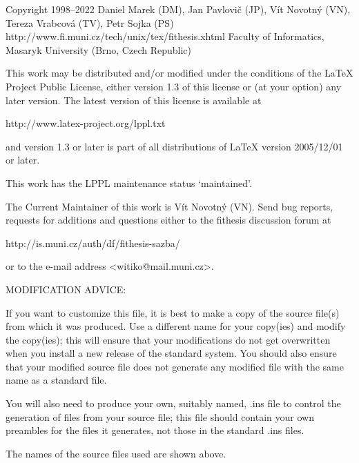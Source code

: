 
\preamble

Copyright 1998--2022  Daniel Marek (DM), Jan Pavlovič (JP),
                      Vít Novotný (VN), Tereza Vrabcová (TV),
                      Petr Sojka (PS)
http://www.fi.muni.cz/tech/unix/tex/fithesis.xhtml
Faculty of Informatics, Masaryk University (Brno, Czech Republic)

This work may be distributed and/or modified under the
conditions of the LaTeX Project Public License, either version
1.3 of this license or (at your option) any later version.
The latest version of this license is available at

  http://www.latex-project.org/lppl.txt

and version 1.3 or later is part of all distributions of LaTeX
version 2005/12/01 or later.

This work has the LPPL maintenance status `maintained'.

The Current Maintainer of this work is Vít Novotný (VN).
Send bug reports, requests for additions and questions
either to the fithesis discussion forum at

  http://is.muni.cz/auth/df/fithesis-sazba/

or to the e-mail address <witiko@mail.muni.cz>.


MODIFICATION ADVICE:

If you want to customize this file, it is best to make a copy of
the source file(s) from which it was produced.  Use a different
name for your copy(ies) and modify the copy(ies); this will ensure
that your modifications do not get overwritten when you install a
new release of the standard system.  You should also ensure that
your modified source file does not generate any modified file with
the same name as a standard file.

You will also need to produce your own, suitably named, .ins file to
control the generation of files from your source file; this file
should contain your own preambles for the files it generates, not
those in the standard .ins files.

The names of the source files used are shown above.

\endpreamble
\askforoverwritefalse
